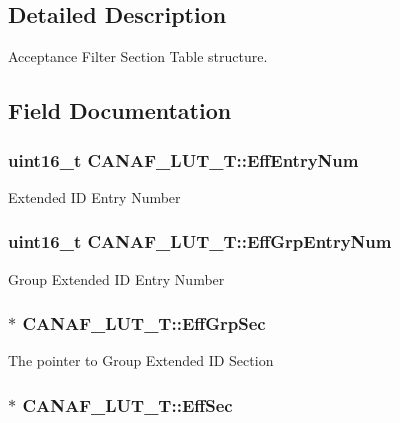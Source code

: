\subsection{Detailed Description}
Acceptance Filter Section Table structure. 

\subsection{Field Documentation}
\hypertarget{structCANAF__LUT__T_a62d74093f87bfd355f53f143b022e3ce}{
\subsubsection[{Eff\-Entry\-Num}]{\setlength{\rightskip}{0pt plus 5cm}uint16\-\_\-t C\-A\-N\-A\-F\-\_\-\-L\-U\-T\-\_\-\-T\-::\-Eff\-Entry\-Num}}\label{structCANAF__LUT__T_a62d74093f87bfd355f53f143b022e3ce}
Extended I\-D Entry Number \hypertarget{structCANAF__LUT__T_a48493bdab0f7818be7082e61284994d8}{
\subsubsection[{Eff\-Grp\-Entry\-Num}]{\setlength{\rightskip}{0pt plus 5cm}uint16\-\_\-t C\-A\-N\-A\-F\-\_\-\-L\-U\-T\-\_\-\-T\-::\-Eff\-Grp\-Entry\-Num}}\label{structCANAF__LUT__T_a48493bdab0f7818be7082e61284994d8}
Group Extended I\-D Entry Number \hypertarget{structCANAF__LUT__T_a62a98cfd049ea67dd3b01d6e6f3871d5}{
\subsubsection[{Eff\-Grp\-Sec}]{$\ast$ C\-A\-N\-A\-F\-\_\-\-L\-U\-T\-\_\-\-T\-::\-Eff\-Grp\-Sec}}\label{structCANAF__LUT__T_a62a98cfd049ea67dd3b01d6e6f3871d5}
The pointer to Group Extended I\-D Section \hypertarget{structCANAF__LUT__T_a30b5814a21e36ca7d9711c0752ff3f4e}{
\subsubsection[{Eff\-Sec}]{$\ast$ C\-A\-N\-A\-F\-\_\-\-L\-U\-T\-\_\-\-T\-::\-Eff\-Sec}}\label{structCANAF__LUT__T_a30b5814a21e36ca7d9711c0752ff3f4e}
